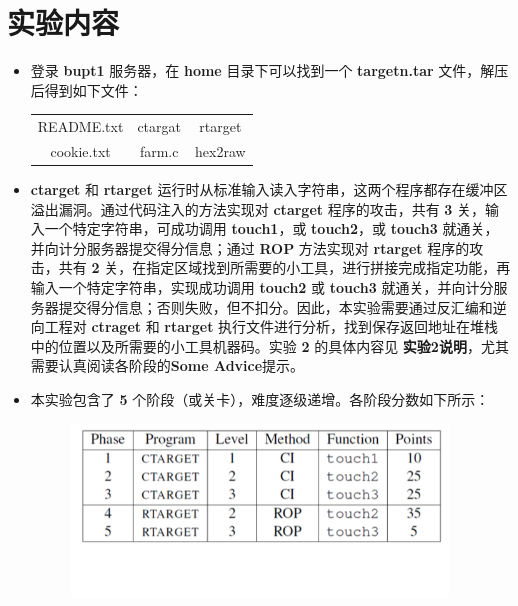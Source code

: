 \section{实验内容}
    \begin{itemize}
        \item 登录 \textbf{bupt1} 服务器，在 \textbf{home} 目录下可以找到一个 \textbf{targetn.tar} 文件，解压后得到如下文件：
        \begin{table}[htbp]
            \centering
            \begin{tabular}{c|c|c}
                README.txt & ctargat & rtarget \\
                cookie.txt & farm.c & hex2raw \\
            \end{tabular}
        \end{table}
        \item \textbf{ctarget} 和 \textbf{rtarget} 运行时从标准输入读入字符串，这两个程序都存在缓冲区溢出漏洞。通过代码注入的方法实现对 \textbf{ctarget} 程序的攻击，共有 \textbf{3} 关，输入一个特定字符串，可成功调用 \textbf{touch1}，或 \textbf{touch2}，或 \textbf{touch3} 就通关，并向计分服务器提交得分信息；通过 \textbf{ROP} 方法实现对 \textbf{rtarget} 程序的攻击，共有 \textbf{2} 关，在指定区域找到所需要的小工具，进行拼接完成指定功能，再输入一个特定字符串，实现成功调用 \textbf{touch2} 或 \textbf{touch3} 就通关，并向计分服务器提交得分信息；否则失败，但不扣分。因此，本实验需要通过反汇编和逆向工程对 \textbf{ctraget} 和 \textbf{rtarget} 执行文件进行分析，找到保存返回地址在堆栈中的位置以及所需要的小工具机器码。实验 \textbf{2} 的具体内容见 \textbf{实验2说明}，尤其需要认真阅读各阶段的\textbf{Some Advice}提示。
        \item 本实验包含了 \textbf{5} 个阶段（或关卡），难度逐级递增。各阶段分数如下所示：
        \begin{figure}[htbp]
            \centering
            \includegraphics*[width = 10cm]{pointTable.png}
        \end{figure}
    \end{itemize}